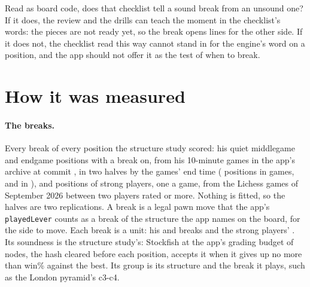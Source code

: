 \documentclass[11pt]{article}
\begin{document}
Read as board code, does that checklist tell a sound break from an unsound one? If it does, the
review and the drills can teach the moment in the checklist's words: the pieces are not ready
yet, so the break opens lines for the other side. If it does not, the checklist read this way
cannot stand in for the engine's word on a position, and the app should not offer it as the test
of when to break.

\section{How it was measured}

\paragraph{The breaks.} Every break of every position the structure study scored: his quiet
middlegame and endgame positions with a break on, from his 10-minute games in the app's archive
at commit \texttt{\AppCommit}, in two halves by the games' end time (\PositionsFirst{} positions
in \GamesFirst{} games, and \PositionsSecond{} in \GamesSecond), and \StrongPositions{} positions
of strong players, one a game, from the Lichess games of September 2026 between two players rated
\Floor{} or more. Nothing is fitted, so the halves are two replications. A break is a legal pawn
move that the app's \texttt{playedLever} counts as a break of the structure the app names on the
board, for the side to move. Each break is a unit: his \BreaksFirst{} and \BreaksSecond{} breaks
and the strong players' \StrongBreaks. Its soundness is the structure study's: Stockfish at the
app's grading budget of \GradeNodes{} nodes, the hash cleared before each position, accepts it
when it gives up no more than \Window{} win\% against the best. Its group is its structure and the
break it plays, such as the London pyramid's c3-c4.
\end{document}
